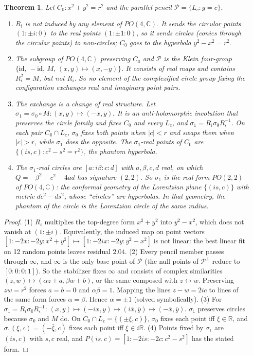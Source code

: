 \documentclass[11pt]{article}
\newtheorem{theorem}{Theorem}\newtheorem{proposition}[theorem]{Proposition}
\theoremstyle{definition}\newtheorem{definition}[theorem]{Definition}\newtheorem{remark}[theorem]{Remark}
\newcommand{\C}{\mathbb{C}}\newcommand{\Z}{\mathbb{Z}}\newcommand{\R}{\mathbb{R}}\renewcommand{\Re}{\operatorname{Re}}\renewcommand{\Im}{\operatorname{Im}}
\begin{document}
\begin{theorem}\label{thm:inv}
Let $C_0:x^2+y^2=r^2$ and the parallel pencil $\mathcal{P}=\{L_c:y=c\}$.
\begin{enumerate}
\item $R_i$ is not induced by any element of $PO(4,\C)$. It sends the circular points $(1:\pm i:0)$ to the real points $(1:\pm1:0)$, so it sends circles (conics through the circular points) to non-circles; $C_0$ goes to the hyperbola $y^2-x^2=r^2$.
\item The subgroup of $PO(4,\C)$ preserving $C_0$ and $\mathcal{P}$ is the Klein four-group $\{\mathrm{id},\,-\mathrm{id},\,M,\,(x,y)\mapsto(x,-y)\}$. It consists of real maps and contains $R_i^2=M$, but not $R_i$. So no element of the complexified circle group fixing the configuration exchanges real and imaginary point pairs.
\item The exchange is a \emph{change of real structure}. Let $\sigma_1=\sigma_0\circ M:(x,y)\mapsto(-\bar x,\bar y)$. It is an anti-holomorphic involution that preserves the circle family and fixes $C_0$ and every $L_c$, and $\sigma_1=R_i\sigma_0R_i^{-1}$. On each pair $C_0\cap L_c$, $\sigma_0$ fixes both points when $|c|<r$ and swaps them when $|c|>r$, while $\sigma_1$ does the opposite. The $\sigma_1$-real points of $C_0$ are $\{(is,c):c^2-s^2=r^2\}$, the phantom hyperbola.
\item The $\sigma_1$-real circles are $[a:i\beta:c:d]$ with $a,\beta,c,d$ real, on which $Q=-\beta^2+c^2-4ad$ has signature $(2,2)$. So $\sigma_1$ is the real form $PO(2,2)$ of $PO(4,\C)$: the conformal geometry of the \emph{Lorentzian} plane $\{(is,c)\}$ with metric $dc^2-ds^2$, whose ``circles'' are hyperbolas. In that geometry, the phantom of the circle is the Lorentzian circle of the same radius.
\end{enumerate}
\end{theorem}
\begin{proof}
(1) $R_i$ multiplies the top-degree form $x^2+y^2$ into $y^2-x^2$, which does not vanish at $(1:\pm i)$. Equivalently, the induced map on point vectors $[1:-2x:-2y:x^2+y^2]\mapsto[1:-2ix:-2y:y^2-x^2]$ is not linear: the best linear fit on 12 random points leaves residual $2.04$.
(2) Every pencil member passes through $\infty$, and $\infty$ is the only base point of $\mathcal{P}$ (the null points of $\mathcal{P}^\perp$ reduce to $[0:0:0:1]$). So the stabilizer fixes $\infty$ and consists of complex similarities $(z,w)\mapsto(\alpha z+a,\beta w+b)$, or the same composed with $z\leftrightarrow w$. Preserving $zw=r^2$ forces $a=b=0$ and $\alpha\beta=1$. Mapping the lines $z-w=2ic$ to lines of the same form forces $\alpha=\beta$. Hence $\alpha=\pm1$ (solved symbolically).
(3) For $\sigma_1=R_i\sigma_0R_i^{-1}$: $(x,y)\mapsto(-ix,y)\mapsto(i\bar x,\bar y)\mapsto(-\bar x,\bar y)$. $\sigma_1$ preserves circles because $\sigma_0$ and $M$ do. On $C_0\cap L_c=\{(\pm\xi,c)\}$, $\sigma_0$ fixes each point iff $\xi\in\R$, and $\sigma_1(\xi,c)=(-\bar\xi,c)$ fixes each point iff $\xi\in i\R$.
(4) Points fixed by $\sigma_1$ are $(is,c)$ with $s,c$ real, and $P(is,c)=[1:-2is:-2c:c^2-s^2]$ has the stated form.
\end{proof}
\end{document}

